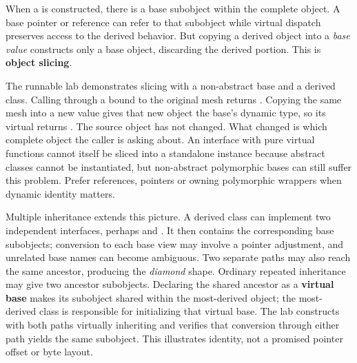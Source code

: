 \hypertarget{05-engine-i-ch004-a-derived-object-contains-a-base-subobject-not-an-interchangeable-base-value}{}

When a  is constructed, there is a  base subobject within the complete object. A base pointer or reference can refer to that subobject while virtual dispatch preserves access to the derived behavior. But copying a derived object into a \emph{base value} constructs only a base object, discarding the derived portion. This is \textbf{object slicing}.

The runnable lab demonstrates slicing with a non-abstract  base and a  derived class. Calling  through a  bound to the original mesh returns . Copying the same mesh into a new  value gives that new object the base's dynamic type, so its virtual  returns . The source object has not changed. What changed is which complete object the caller is asking about. An interface with pure virtual functions cannot itself be sliced into a standalone instance because abstract classes cannot be instantiated, but non-abstract polymorphic bases can still suffer this problem. Prefer references, pointers or owning polymorphic wrappers when dynamic identity matters.

Multiple inheritance extends this picture. A derived class can implement two independent interfaces, perhaps  and . It then contains the corresponding base subobjects; conversion to each base view may involve a pointer adjustment, and unrelated base names can become ambiguous. Two separate paths may also reach the same ancestor, producing the \emph{diamond} shape. Ordinary repeated inheritance may give two ancestor subobjects. Declaring the shared ancestor as a \textbf{virtual base} makes its subobject shared within the most-derived object; the most-derived class is responsible for initializing that virtual base. The lab constructs  with both paths virtually inheriting  and verifies that conversion through either path yields the same  subobject. This illustrates identity, not a promised pointer offset or byte layout.

